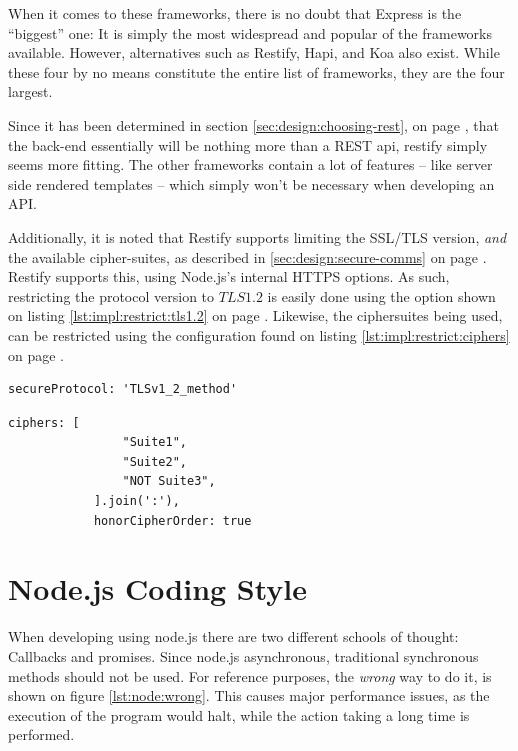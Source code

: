 		When it comes to these frameworks, there is no doubt that Express is the ``biggest'' one: It is simply the most widespread and popular of the frameworks available. However, alternatives such as Restify, Hapi, and Koa also exist. While these four by no means constitute the entire list of frameworks, they are the four largest.

		Since it has been determined in section \ref{sec:design:choosing-rest}, on page \pageref{sec:design:choosing-rest}, that the back-end essentially will be nothing more than a REST api, restify simply seems more fitting. The other frameworks contain a lot of features -- like server side rendered templates -- which simply won't be necessary when developing an API. 

		Additionally, it is noted that Restify supports limiting the SSL/TLS version, \emph{and} the available cipher-suites, as described in \ref{sec:design:secure-comms} on page \pageref{sec:design:secure-comms}. Restify supports this, using Node.js's internal HTTPS options. As such, restricting the protocol version to $TLS1.2$ is easily done using the option shown on listing \ref{lst:impl:restrict:tls1.2} on page \pageref{lst:impl:restrict:tls1.2}. Likewise, the ciphersuites being used, can be restricted using the configuration found on listing \ref{lst:impl:restrict:ciphers} on page \pageref{lst:impl:restrict:ciphers}.

		\begin{lstlisting}[style=json2,gobble=12, caption={Restricting Restify to use TLS 1.2},label={lst:impl:restrict:tls1.2}]
            secureProtocol: 'TLSv1_2_method'
		\end{lstlisting}

		\begin{lstlisting}[style=json2,gobble=12, caption={Restricting the TLS cipher suites that Restify uses. Ciphers here are \emph{examples}, as the actual list would take up too much place.},label={lst:impl:restrict:ciphers}]
            ciphers: [
                "Suite1",
                "Suite2",
                "NOT Suite3",
            ].join(':'),
            honorCipherOrder: true
		\end{lstlisting}


	\section{Node.js Coding Style}
		\label{sec:impl:node:style}
		When developing using node.js there are two different schools of thought: Callbacks and promises. Since node.js asynchronous, traditional synchronous methods should not be used. For reference purposes, the \emph{wrong} way to do it, is shown on figure \ref{lst:node:wrong}. This causes major performance issues, as the execution of the program would halt, while the action taking a long time is performed.

